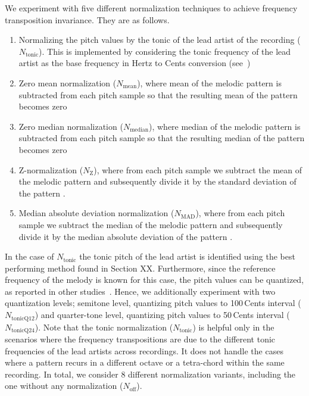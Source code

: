 We experiment with five different normalization techniques to achieve frequency transposition invariance. They are as follows. 
\begin{enumerate}
	\item Normalizing the pitch values by the tonic of the lead artist of the recording ($N_{\mathrm{tonic}}$). This is implemented by considering the tonic frequency of the lead artist as the base frequency in Hertz to Cents conversion (see~)
	\item Zero mean normalization ($N_{\mathrm{mean}}$), where mean of the melodic pattern is subtracted from each pitch sample so that the resulting mean of the pattern becomes zero
	\item Zero median normalization ($N_{\mathrm{median}}$), where median of the melodic pattern is subtracted from each pitch sample so that the resulting median of the pattern becomes zero
	\item Z-normalization ($N_{\mathrm{Z}}$), where from each pitch sample we subtract the mean of the melodic pattern and subsequently divide it by the standard deviation of the pattern .
	\item Median absolute deviation normalization ($N_{\mathrm{MAD}}$), where from each pitch sample we subtract the median of the melodic pattern and subsequently divide it by the median absolute deviation of the pattern .
\end{enumerate}

In the case of $N_{\mathrm{tonic}}$ the tonic pitch of the lead artist is identified using the best performing method found in Section XX. Furthermore, since the reference frequency of the melody is known for this case, the pitch values can be quantized, as reported in other studies~\cite{Ross2012b}. Hence, we additionally experiment with two quantization levels; semitone level, quantizing pitch values to 100\,Cents interval ($N_{\mathrm{tonicQ12}}$) and quarter-tone level,  quantizing pitch values to 50\,Cents interval ($N_{\mathrm{tonicQ24}}$). Note that the tonic normalization ($N_{\mathrm{tonic}}$) is helpful only in the scenarios where the frequency transpositions are due to the different tonic frequencies of the lead artists across recordings. It does not handle the cases where a pattern recurs in a different octave or a tetra-chord within the same recording. In total, we consider 8 different normalization variants, including the one without any normalization ($N_{\mathrm{off}}$). 


